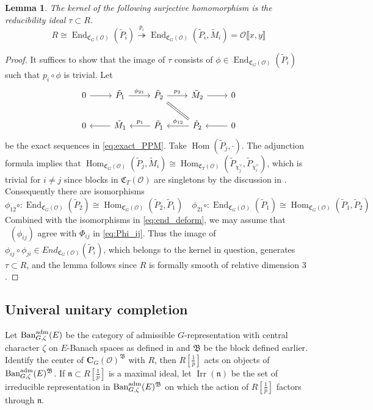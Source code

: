 \documentclass[leqno]{amsart}
\newcommand{\Ban}{\textnormal{Ban}^{\textnormal{adm}}}
\newcommand{\B}{\mathfrak B}
\newcommand{\fC}{\mathfrak C}
\DeclareMathOperator{\V}{\check{\mathbf{V}}} %
\DeclareMathOperator{\Irr}{Irr}
\newcommand{\C}{\mathbf C}
\newcommand{\oo}{\mathcal{O}} %
\newcommand{\fn}{\mathfrak{n}}
\DeclareMathOperator{\End}{End}
\DeclareMathOperator{\Hom}{Hom}
\newtheorem{lem}[thm]{Lemma}
\theoremstyle{definition}
\theoremstyle{remark}
\begin{document}
\begin{lem}\label{lem:ker_red}
	The kernel of the following 
	surjective homomorphism 
	is the reducibility ideal $\tau\subset R$.
	\begin{equation}
	R\cong 
	\End_{\fC_G(\oo)}(\tilde{P}_i)
	\overset{p_i}{\twoheadrightarrow}
	\End_{\fC_G(\oo)}(\tilde{P}_i, \tilde{M}_i)=
	\oo\llbracket x,y\rrbracket
	\end{equation}
\end{lem}
\begin{proof}
It suffices to show that 
the image of $\tau$ consists of 
$\phi\in \End_{\fC_G(\oo)}(\tilde{P}_i)$
such that $p_i\circ \phi$ is trivial.
Let
\[
\begin{tikzcd}
	0 \arrow[r]&
	\tilde{P}_1  \arrow[r,"\phi_{21}"]  &
	\tilde{P}_2 \arrow[r,"p_2"] \arrow[dr,equal] &
	\tilde{M}_2  \arrow[r] & 0 \\
	0 & 
	\tilde{M}_1 \arrow[l]&
	\tilde{P}_1 \arrow[l,"p_1",swap]  &
	\tilde{P}_2  \arrow[l,"\phi_{12}",swap]  & 
	0  \arrow[l] 
\end{tikzcd}
\]
be the exact sequences in \eqref{eq:exact_PPM}.
Take $\Hom(\tilde{P}_j,\cdot)$.
The adjunction formula implies that
$\Hom_{\fC_G(\oo)}(\tilde{P}_j,\tilde{M}_i)\cong
\Hom_{\fC_T(\oo)}
(\tilde{P}_{\chi_j^\vee},\tilde{P}_{\chi_i^\vee})$,
which is trivial for $i\neq j$
since blocks in $\fC_T(\oo)$ are singletons
by the discussion in \cite[\S 7.2]{pask}.
Consequently there are isomorphisms
\[
	\phi_{12}\circ\colon
	\End_{\fC_G(\oo)}(\tilde{P}_2)\cong
	\Hom_{\fC_G(\oo)}(\tilde{P}_2, \tilde{P}_1)\quad
	\phi_{21}\circ\colon
	\End_{\fC_G(\oo)}(\tilde{P}_1)\cong
	\Hom_{\fC_G(\oo)}(\tilde{P}_1, \tilde{P}_2)
\]
Combined with the isomorphisms in \eqref{eq:end_deform},
we may assume that $\V(\phi_{ij})$ agree with 
$\Phi_{ij}$ in \eqref{eq:Phi_ij}.
Thus the image of 
$\phi_{ij}\circ\phi_{ji}\in End_{\fC_G(\oo)}(\tilde{P}_i)$,
which belongs to the kernel in question,
generates $\tau\subset R$,
and the lemma follows 
since  $R$ is formally smooth of relative dimension  $3$.
\end{proof}

\subsection{Univeral unitary completion}

Let $\Ban_{G,\zeta}(E)$
be the category of admissible 
$G$-representation with central character $\zeta$
on $E$-Banach spaces
as defined in \cite{pask}
and  $\B$ be the block defined earlier.
Identify the center of $\C_G(\oo)^\B$ with  $R$,
then  $R[\frac{1}{p}]$ acts on objects of $\Ban_{G,\zeta}(E)^{\B}$.
If $\fn\subset R[\frac{1}{p}]$ is a maximal ideal,
let $\Irr(\fn)$ be the set of
irreducible representation in  $\Ban_{G,\zeta}(E)^{\B}$
on which the action of $R[\frac{1}{p}]$ 
factors through $\fn$.
\end{document}
